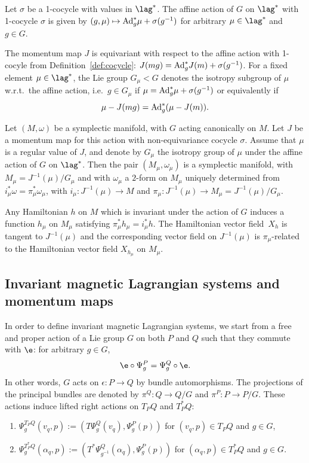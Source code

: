 \begin{definition} Let $\sigma$ be a 1-cocycle with values in $\lag^*$. The af\/f\/ine action of $G$ on $\lag^*$ with 1-cocycle $\sigma$ is given by $(g,\mu)\mapsto {\rm Ad}^*_{g}\mu +\sigma(g^{-1})$ for arbitrary $\mu\in\lag^*$ and $g\in G$.
\end{definition}
The momentum map $J$ is equivariant with respect to the af\/f\/ine action with 1-cocyle from Definition~\ref{def:cocycle}: $J(mg)= {\rm Ad}_g^* J(m)+ \sigma(g^{-1})$. For a f\/ixed element $\mu\in\lag^*$, the Lie group $G_\mu<G$ denotes the isotropy subgroup of $\mu$ w.r.t.\ the af\/f\/ine action, i.e.\ $g\in G_\mu$ if $\mu = {\rm Ad}_{g}^*\mu + \sigma(g^{-1})$ or equivalently if \[\mu - J(mg) = {\rm Ad}_g^*(\mu - J(m)).\]

\begin{theorem}\label{thm:mw}
Let $(M,\omega)$ be a symplectic manifold, with $G$ acting canonically on $M$. Let $J$ be a momentum map for this action with non-equivariance cocycle $\sigma$. Assume that $\mu$ is a regular value of $J$, and denote by $G_\mu$ the isotropy group of $\mu$ under the affine action of $G$ on $\lag^*$. Then the pair $(M_\mu,\omega_\mu)$ is a symplectic manifold, with $M_\mu = J^{-1}(\mu)/G_\mu$ and with $\omega_\mu$ a $2$-form on $M_\mu$ uniquely determined from $i^*_\mu \omega=\pi_\mu^*\omega_\mu$, with  $i_\mu:J^{-1}(\mu)\to M$ and $\pi_\mu: J^{-1}(\mu)\to M_\mu=J^{-1}(\mu)/G_\mu$.

Any Hamiltonian $h$ on $M$ which is invariant under the action of $G$ induces a function $h_\mu$ on $M_\mu$ satisfying $\pi_\mu^*h_\mu = i^*_\mu h$. The Hamiltonian vector field~$X_h$ is tangent to $J^{-1}(\mu)$ and the corresponding vector field on $J^{-1}(\mu)$ is $\pi_\mu$-related to the Hamiltonian vector field $X_{h_\mu}$ on $M_\mu$.
\end{theorem}


\subsection{Invariant magnetic Lagrangian systems and momentum maps}\label{section4.2}
In order to def\/ine invariant magnetic Lagrangian systems, we start from a free and proper action of a Lie group $G$ on both $P$ and $Q$ such that they commute with $\e$: for arbitrary $g\in G$,
\begin{gather}\label{compatiblea}\e\circ\Psi^P_g=\Psi^Q_g\circ\e.\end{gather}
In other words, $G$ acts on $\epsilon: P \to Q$ by bundle automorphisms.
The projections of the principal bundles are denoted by $\pi^Q:Q\to Q/G$ and $\pi^P:P\to P/G$.
These actions induce lifted right actions on $T_PQ$ and $T_P^*Q$:
\begin{enumerate}\itemsep=0pt
\item[1)] $\Psi^{T_PQ}_g(v_q,p):= (T\Psi^Q_g(v_q),\Psi^P_g(p))$ for $(v_q,p)\in T_PQ$ and $g\in G$,
\item[2)] $\Psi^{T^*_PQ}_g(\alpha_q,p):= (T^*\Psi^Q_{g^{-1}}(\alpha_q),\Psi^P_g(p))$ for $(\alpha_q,p)\in T^*_PQ$ and $g\in G$.
\end{enumerate}

